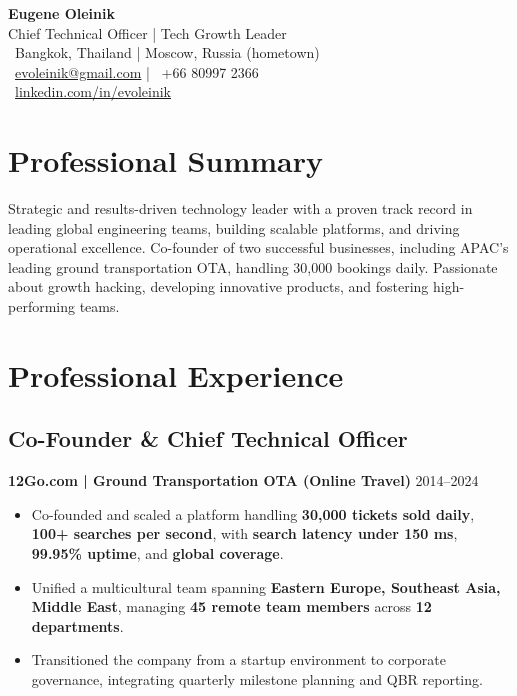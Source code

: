 \documentclass[11pt,a4paper]{article}
\begin{document}
\begin{center}
    \colorbox{headerbg}{\parbox{\textwidth}{
        \vspace{0.5em}
        {\Huge\textbf{Eugene Oleinik}} \\[0.3em]
        {\Large\color{secondarycolor} Chief Technical Officer | Tech Growth Leader} \\[0.5em]
        {\color{secondarycolor}
        \faMapMarker \, Bangkok, Thailand | Moscow, Russia (hometown) \\[0.2em]
        \faEnvelope \, \href{mailto:evoleinik@gmail.com}{evoleinik@gmail.com} | \faPhone \, +66 80997 2366 \\[0.2em]
        \faLinkedin \, \href{http://linkedin.com/in/evoleinik}{linkedin.com/in/evoleinik}}
        \vspace{0.5em}
    }}
\end{center}


\section*{Professional Summary}
{
Strategic and results-driven technology leader with a proven track record in leading global engineering teams, building scalable platforms, and driving operational excellence. Co-founder of two successful businesses, including APAC's leading ground transportation OTA, handling 30,000 bookings daily. Passionate about growth hacking, developing innovative products, and fostering high-performing teams.}

\section*{Professional Experience}

\subsection*{Co-Founder \& Chief Technical Officer}
\textbf{12Go.com | Ground Transportation OTA (Online Travel)} \hfill 2014--2024
\begin{itemize}
    \item Co-founded and scaled a platform handling \textbf{30,000 tickets sold daily}, \textbf{100+ searches per second}, with \textbf{search latency under 150 ms}, \textbf{99.95\% uptime}, and \textbf{global coverage}.
    \item Unified a multicultural team spanning \textbf{Eastern Europe, Southeast Asia, Middle East}, managing \textbf{45 remote team members} across \textbf{12 departments}.
    \item Transitioned the company from a startup environment to corporate governance, integrating quarterly milestone planning and QBR reporting.
\end{itemize}
\end{document}
